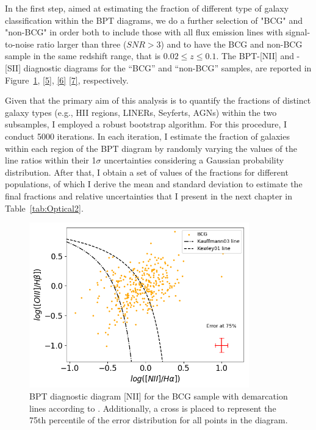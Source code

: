 In the first step, aimed at estimating the fraction of different type of galaxy classification within the BPT diagrams, we do a further selection of "BCG" and "non-BCG" in order both to include those with all flux emission lines with signal-to-noise ratio larger than three ($SNR>3$) and to have the BCG and non-BCG sample in the same redshift range, that is $0.02 \leq z \leq 0.1$.
The BPT-[NII] and -[SII] diagnostic diagrams for the “BCG” and “non-BCG” samples, are reported in Figure~\ref{4}, \ref{5}, \ref{6}  \ref{7}, respectively.

Given that the primary aim of this analysis is to quantify the fractions of distinct galaxy types (e.g., HII regions, LINERs, Seyferts, AGNs) within the two subsamples, I employed a robust bootstrap algorithm. For this procedure, I conduct 5000 iterations. In each iteration, I estimate the fraction of galaxies within each region of the BPT diagram by randomly varying the values of the line ratios within their 1$\sigma$ uncertainties considering a Gaussian probability distribution. After that, I obtain a set of values of the fractions for different populations, of which I derive the mean and standard deviation to estimate the final fractions and relative uncertainties that I present in the next chapter in Table~\ref{tab:Optical2}.

\vspace{2cm}
\begin{figure}[hbtp]
  \centering
  \includegraphics[width=0.85\textwidth]{BCG-NII-V22}
  \caption{BPT diagnostic diagram [NII] for the BCG sample with demarcation lines according to \cite{2006MNRAS.372..961K}.
  Additionally, a cross is placed to represent the 75th percentile of the error distribution for all points in the diagram.  }
  \label{4}
\end{figure}

